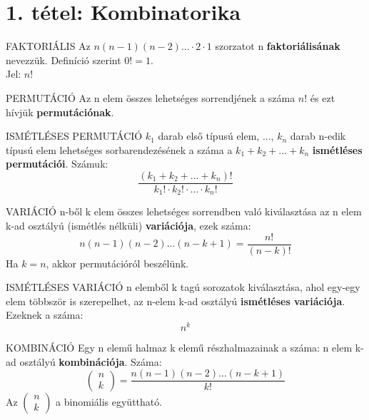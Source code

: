 \section{1. tétel: Kombinatorika}

\begin{definicio}{FAKTORIÁLIS}
Az $n(n-1)(n-2)...\cdot2\cdot1$ szorzatot n \textbf{faktoriálisának} nevezzük. Definíció szerint $0! = 1$.\\
Jel: $n!$
\end{definicio}

\begin{definicio}{PERMUTÁCIÓ}
Az n elem összes lehetséges sorrendjének a száma $n!$ és ezt hívjük \textbf{permutációnak}.
\end{definicio}

\begin{definicio}{ISMÉTLÉSES PERMUTÁCIÓ}
$k_1$ darab első típusú elem, ..., $k_n$ darab n-edik típusú elem lehetséges sorbarendezésének a száma a $k_1 + k_2 + ... + k_n$ \textbf{ismétléses permutációi}. Számuk:
$$\frac{(k_1+k_2+...+k_n)!}{k_1!\cdot k_2!\cdot...\cdot k_n!}$$
\end{definicio}

\begin{definicio}{VARIÁCIÓ}
n-ből k elem összes lehetséges sorrendben való kiválasztása az n elem k-ad osztályú (ismétlés nélküli) \textbf{variációja}, ezek száma:
$$n(n-1)(n-2)...(n-k+1) = \frac{n!}{(n-k)!}$$
Ha $k=n$, akkor permutációról beszélünk.
\end{definicio}

\begin{definicio}{ISMÉTLÉSES VARIÁCIÓ}
n elemből k tagú sorozatok kiválasztása, ahol egy-egy elem többször is szerepelhet, az n-elem k-ad osztályú \textbf{ismétléses variációja}. Ezeknek a száma:
$$n^k$$
\end{definicio}

\begin{definicio}{KOMBINÁCIÓ}
Egy n elemű halmaz k elemű részhalmazainak a száma: n elem k-ad osztályú \textbf{kombinációja}. Száma:
$$\begin{pmatrix}
n\\k
\end{pmatrix} = \frac{n(n-1)(n-2)...(n-k+1)}{k!}$$
Az $\begin{pmatrix}
n\\k
\end{pmatrix}$ a binomiális együttható.
\end{definicio}

